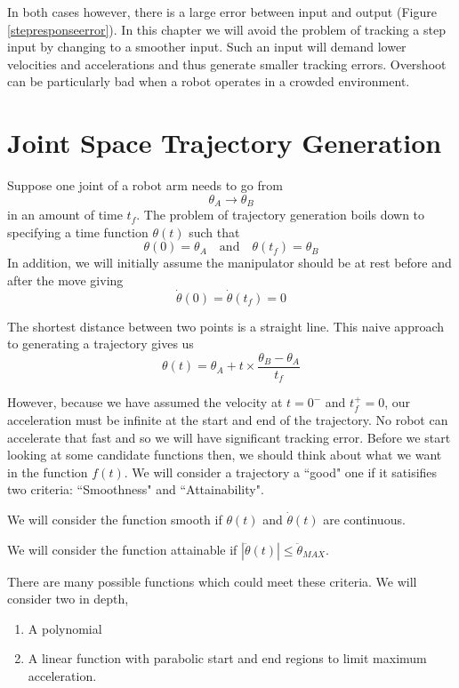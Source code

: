 In both cases however, there is a large error between input and output (Figure \ref{stepresponseerror}).   In this chapter we will avoid the problem of tracking a step input by changing to a smoother input.  Such an input will demand lower velocities and accelerations and thus generate smaller tracking errors.  Overshoot can be particularly bad when a robot operates in a crowded environment.


\section{Joint Space Trajectory Generation}
Suppose one joint of a robot arm needs to go from
\[
\theta_A \to \theta_B
\]
in an amount of time $t_f$.
The problem of trajectory generation boils down to specifying a time function $\theta(t)$ such that
\[
\theta(0) = \theta_A \quad \mathrm{and} \quad \theta(t_f) = \theta_B
\]
In addition, we will initially assume the manipulator should be at rest before and after the move giving
\[
\dot{\theta}(0) =  \dot{\theta}(t_f) = 0
\]

The shortest distance between two points is a straight line.  This naive approach to generating a trajectory gives us
\[
\theta(t) = \theta_A + t \times \frac{\theta_B-\theta_A}{t_f}
\]

However, because we have assumed the velocity at $t=0^- $ and $t_f^+ = 0$, our acceleration must be infinite at the start and end of the trajectory.  No robot can accelerate that fast and so we will have significant tracking error.   Before we start looking at some candidate functions then, we should think about what we want in the function $f(t)$.    We will consider a trajectory a ``good" one if it satisifies two criteria:  ``Smoothness" and ``Attainability".

We will consider the function smooth if $\theta(t)$ and $\dot{\theta}(t)$ are continuous.

We will consider the function attainable if $|\ddot{\theta}(t)| \leq \ddot{\theta}_{MAX}$.

There are   many possible functions which could meet these criteria.  We will consider two in depth,

\begin{enumerate}
\item A polynomial
\item A linear function with parabolic start and end regions to limit maximum acceleration.
\end{enumerate}


